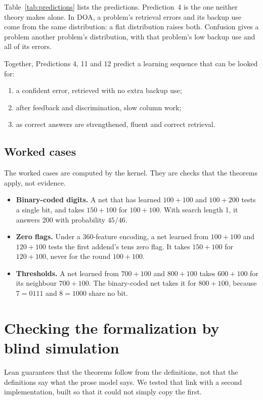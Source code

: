 \documentclass[11pt]{article}
\begin{document}
Table~\ref{tab:predictions} lists the predictions. Prediction~4 is the one neither theory makes alone. In DOA, a problem's retrieval errors and its backup use come from the same distribution: a flat distribution raises both. Confusion gives a problem another problem's distribution, with that problem's low backup use and all of its errors.

Together, Predictions 4, 11 and 12 predict a learning sequence that can be looked for:
\begin{enumerate}
  \item a confident error, retrieved with no extra backup use;
  \item after feedback and discrimination, slow column work;
  \item as correct answers are strengthened, fluent and correct retrieval.
\end{enumerate}

\subsection{Worked cases}

The worked cases are computed by the kernel. They are checks that the theorems apply, not evidence.
\begin{itemize}
  \item \textbf{Binary-coded digits.} A net that has learned $100+100$ and $100+200$ tests a single bit, and takes $150+100$ for $100+100$. With search length 1, it answers 200 with probability $45/46$.
  \item \textbf{Zero flags.} Under a 360-feature encoding, a net learned from $100+100$ and $120+100$ tests the first addend's tens zero flag. It takes $150+100$ for $120+100$, never for the round $100+100$.
  \item \textbf{Thresholds.} A net learned from $700+100$ and $800+100$ takes $600+100$ for its neighbour $700+100$. The binary-coded net takes it for $800+100$, because $7 = 0111$ and $8 = 1000$ share no bit.
\end{itemize}

\section{Checking the formalization by blind simulation}
\label{sec:blind}

Lean guarantees that the theorems follow from the definitions, not that the definitions say what the prose model says. We tested that link with a second implementation, built so that it could not simply copy the first.
\end{document}
